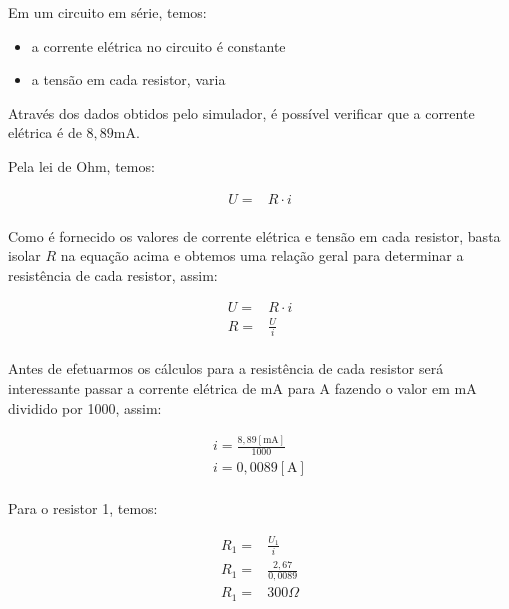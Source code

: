 Em um circuito em série, temos:
\begin{itemize}
    \item{a corrente elétrica no circuito é constante}
    \item{a tensão em cada resistor, varia}
\end{itemize}

Através dos dados obtidos pelo simulador, é possível verificar que a corrente elétrica é de $8,89 \text{mA}$.

Pela lei de Ohm, temos:

\begin{ceqn}
    \begin{align*}
        U =& R \cdot i \\
    \end{align*}
\end{ceqn}

Como é fornecido os valores de corrente elétrica e tensão em cada resistor, basta isolar $R$ na equação acima e obtemos uma relação geral para determinar a resistência de cada resistor, assim:

\begin{ceqn}
    \begin{align*}
        U =& R \cdot i \\
        R =& \frac{U}{i} \\
    \end{align*}
\end{ceqn}

Antes de efetuarmos os cálculos para a resistência de cada resistor será interessante passar a corrente elétrica de mA para A fazendo o valor em mA dividido por 1000, assim:

\begin{ceqn}
    \begin{align*}
        i = \frac{8,89 [\text{mA}]}{1000} \\
        i = 0,0089 [\text{A}] \\
    \end{align*}
\end{ceqn}

Para o resistor 1, temos:

\begin{ceqn}
    \begin{align*}
        R_1 =& \frac{U_1}{i} \\
        R_1 =& \frac{2,67}{0,0089} \\
        R_1 =& 300 \Omega \\
    \end{align*}
\end{ceqn}

